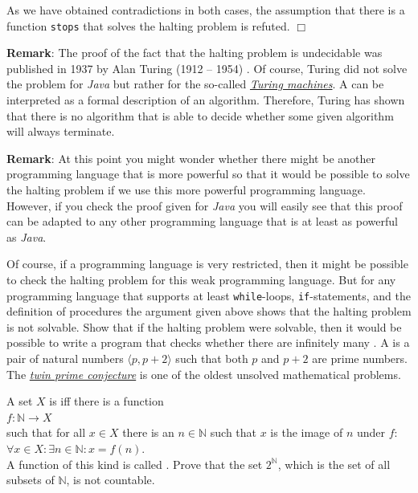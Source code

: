 As we have obtained contradictions in both cases, the assumption that there is a function
\texttt{stops} that solves the halting problem is refuted.
\hspace*{\fill} $\Box$
\vspace*{0.3cm}

\noindent
\textbf{Remark}:
The proof of the fact that the halting problem is undecidable was published in 1937 by Alan Turing (1912 -- 1954)
\cite{turing:1937}.
Of course, Turing did not solve the problem for \textsl{Java} but rather
for the so-called 
\href{https://en.wikipedia.org/wiki/Turing_machine}{\emph{Turing machines}}.
A   
can be interpreted as a formal description of an algorithm.
Therefore, Turing has shown that there is no algorithm that is able to decide whether some given
algorithm will always terminate.
\vspace*{0.3cm}

\noindent
\textbf{Remark}:
At this point you might wonder whether there might be another programming language
that is more powerful so that it would be possible to solve the halting problem if we use this more powerful
programming language.
However, if you check the proof given for \textsl{Java} you will easily
see that this proof can be adapted to any other programming language that is at least as powerful as
\textsl{Java}.
\eox

Of course, if a programming language is very restricted, then it might be possible to check the
halting problem for this weak programming language.
But for any programming language that supports
at least \texttt{while}-loops, \texttt{if}-statements, and the definition of procedures the argument
given above shows that the halting problem is not solvable.
\exerciseEng
Show that if the halting problem were solvable, then it would be possible to write a program that checks
whether there are infinitely many .
A  is a pair of natural numbers
$\langle p, p + 2 \rangle$ such that both $p$ and $p+2$ are prime numbers.
The \href{http://en.wikipedia.org/wiki/Twin_prime_conjecture}{\emph{twin prime conjecture}} is one
of the oldest unsolved mathematical problems.
\eox

\exerciseEng
A set $X$ is  iff there is a function 
\\[0.2cm]
\hspace*{1.3cm}
 $f: \mathbb{N} \rightarrow X$ 
\\[0.2cm]
such that for all $x\in X$ there is an $n \in \mathbb{N}$ such that $x$ is the image of
$n$ under $f$: 
\\[0.2cm]
\hspace*{1.3cm} $\forall x \in X: \exists n \in \mathbb{N}: x = f(n)$.
\\[0.2cm]
A function of this kind is called . 
Prove that the set $2^\mathbb{N}$, which is the set of all subsets of $\mathbb{N}$, is not countable.
\vspace*{0.2cm}

